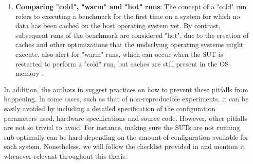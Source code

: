 \begin{enumerate}
	\item \textbf{Comparing "cold", "warm" and "hot" runs}: The concept of a "cold" run refers to executing a benchmark for the first time on a system for which no data has been cached on the host operating system yet. By contrast, subsequent runs of the benchmark are considered "hot", due to the creation of caches and other optimizations that the underlying operating systems might execute. \citeauthor{raasveldtFairBenchmarkingConsidered2018} \cite{raasveldtFairBenchmarkingConsidered2018} also alert for "warm" runs, which can occur when the SUT is restarted to perform a "cold" run, but caches are still present in the OS memory \cite{raasveldtFairBenchmarkingConsidered2018}.
	
\end{enumerate}

In addition, the authors in \cite{raasveldtFairBenchmarkingConsidered2018} suggest practices on how to prevent these pitfalls from happening. In some cases, such as that of non-reproducible experiments, it can be easily avoided by including a detailed specification of the configuration parameters used, hardware specifications and source code. However, other pitfalls are not so trivial to avoid. For instance, making sure the SUTs are not running sub-optimally can be hard depending on the amount of configuration available for each system. Nonetheless, we will follow the checklist provided in \cite[Appendix~A]{raasveldtFairBenchmarkingConsidered2018} and mention it whenever relevant throughout this thesis. 
